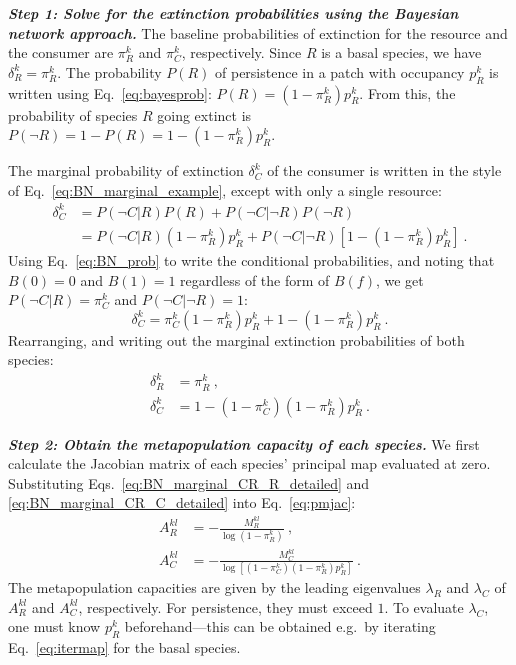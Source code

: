 \documentclass[11pt]{article}
\begin{document}
\textit{\textbf{Step 1: Solve for the extinction probabilities using the Bayesian network approach.}}
The baseline probabilities of extinction for the resource and the consumer are $\pi_R^k$ and $\pi_C^k$, respectively. Since $R$ is a basal species, we have $\delta_R^k = \pi_R^k$. The probability $P(R)$ of persistence in a patch with occupancy $p_R^k$ is written using Eq.~\ref{eq:bayesprob}: $P(R) = (1 - \pi_R^k) p_R^k$. From this, the probability of species $R$ going extinct is $P(\neg R) = 1 - P(R) = 1 - (1 - \pi_R^k) p_R^k$. 

The marginal probability of extinction $\delta_C^k$ of the consumer is written in the style of Eq.~\ref{eq:BN_marginal_example}, except with only a single resource:
\begin{equation}
  \label{eq:BN_marginal_CR}
  \begin{split}
    \delta_C^k &= P(\neg C|R) P(R) + P(\neg C|\neg R) P(\neg R)
    \\ &= P(\neg C|R) (1 - \pi_R^k) p_R^k + P(\neg C|\neg R) [ 1 - (1 - \pi_R^k)
    p_R^k ] \ .
  \end{split}
\end{equation}
Using Eq.~\ref{eq:BN_prob} to write the conditional probabilities, and noting that $B(0)=0$ and $B(1)=1$ regardless of the form of $B(f)$, we get $P(\neg C|R) = \pi_C^k$ and $P(\neg C|\neg R) = 1$:
\begin{equation}
  \label{eq:BN_marginal_CR_2}
  \delta_C^k = \pi_C^k (1 - \pi_R^k) p_R^k + 1 - (1 - \pi_R^k) p_R^k \ .
\end{equation}
Rearranging, and writing out the marginal extinction probabilities of both species:
\begin{align}
  \label{eq:BN_marginal_CR_R_detailed}
  \delta_R^k &= \pi_R^k \ , \\
  \label{eq:BN_marginal_CR_C_detailed}
  \delta_C^k &= 1 - (1 - \pi_C^k) (1 - \pi_R^k) p_R^k \ .
\end{align}

\textit{\textbf{Step 2: Obtain the metapopulation capacity of each species.}}
We first calculate the Jacobian matrix of each species' principal map evaluated at zero. Substituting Eqs.~\ref{eq:BN_marginal_CR_R_detailed} and \ref{eq:BN_marginal_CR_C_detailed} into Eq.~\ref{eq:pmjac}:
\begin{align}
  \label{eq:BN_A_CR_R}
  A_R^{kl} &= -\frac{M_R^{kl}}{\log(1 - \pi_R^k)} \ , \\
  \label{eq:BN_A_CR_C}
  A_C^{kl} &= -\frac{M_C^{kl}}{\log[(1 - \pi_C^k) (1 - \pi_R^k) p_R^k]} \ .
\end{align}
The metapopulation capacities are given by the leading eigenvalues $\lambda_R$ and $\lambda_C$ of $A_R^{kl}$ and $A_C^{kl}$, respectively. For persistence, they must exceed $1$. To evaluate $\lambda_C$, one must know $p_R^k$ beforehand---this can be obtained e.g.\ by iterating Eq.~\ref{eq:itermap} for the basal species.
\end{document}
